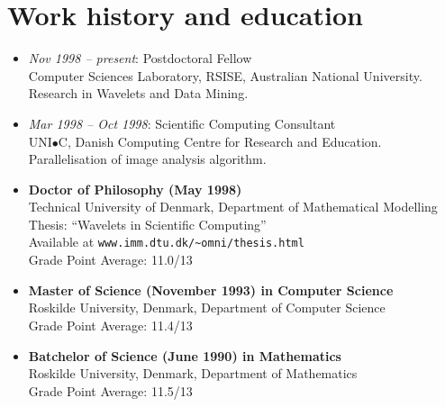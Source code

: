 \documentclass[12pt,a4paper]{article}
\begin{document}
\section*{Work history and education}
\begin{itemize}
\item {\em Nov 1998 -- present}: Postdoctoral Fellow \\
      Computer Sciences Laboratory, RSISE, Australian National University.\\ 
      Research in Wavelets and Data Mining.
\item {\em Mar 1998 -- Oct 1998}: Scientific Computing Consultant \\
      UNI$\bullet$C, Danish Computing Centre for Research and Education.\\
      Parallelisation of image analysis algorithm.
%
\item {\bf Doctor of Philosophy (May 1998)} \\
Technical University of Denmark,  
Department of Mathematical Modelling  \\
Thesis: ``Wavelets in Scientific Computing''\\
Available at {\tt www.imm.dtu.dk/\~{}omni/thesis.html} \\ 
Grade Point Average: 11.0/13    %

\item  {\bf Master of Science (November 1993) in Computer Science} \\
Roskilde University, Denmark, 
Department of Computer Science \\ 
Grade Point Average: 11.4/13  %

\item {\bf Batchelor of Science (June 1990) in Mathematics} \\
Roskilde University, Denmark, 
Department of Mathematics \\ 
Grade Point Average: 11.5/13  %
\end{itemize}
\end{document}
